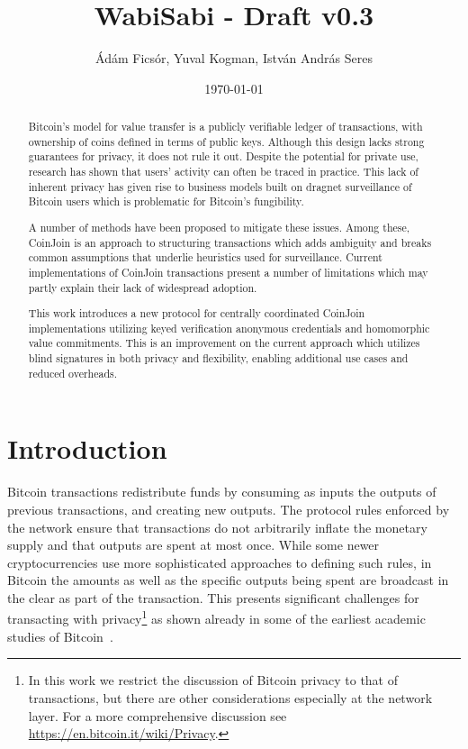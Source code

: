 \documentclass{article}
\title{WabiSabi - Draft v0.3}
\author{Ádám Ficsór, Yuval Kogman, István András Seres}
\date{\today}
\begin{document}
\maketitle

\begin{abstract}
  Bitcoin's model for value transfer is a publicly verifiable ledger of transactions, with ownership of coins defined in terms of public keys. Although this design lacks strong guarantees for privacy, it does not rule it out.
  Despite the potential for private use, research has shown that users' activity can often be traced in practice.
  This lack of inherent privacy has given rise to business models built on dragnet surveillance of Bitcoin users which is problematic for Bitcoin's fungibility.

  A number of methods have been proposed to mitigate these issues. Among these, CoinJoin is an approach to structuring transactions which adds ambiguity and breaks common assumptions that underlie heuristics used for surveillance.
  Current implementations of CoinJoin transactions present a number of limitations which may partly explain their lack of widespread adoption.

  This work introduces a new protocol for centrally coordinated CoinJoin implementations utilizing keyed verification anonymous credentials and homomorphic value commitments. This is an improvement on the current approach which utilizes blind signatures in both privacy and flexibility, enabling additional use cases and reduced overheads.
\end{abstract}

\section{Introduction}

Bitcoin transactions redistribute funds by consuming as inputs the outputs of previous transactions, and creating new outputs. The protocol rules enforced by the network ensure that transactions do not arbitrarily inflate the monetary supply and that outputs are spent at most once. While some newer cryptocurrencies use more sophisticated approaches to defining such rules, in Bitcoin the amounts as well as the specific outputs being spent are broadcast in the clear as part of the transaction. This presents significant challenges for transacting with privacy\footnote{In this work we restrict the discussion of Bitcoin privacy to that of transactions, but there are other considerations especially at the network layer. For a more comprehensive discussion see \url{https://en.bitcoin.it/wiki/Privacy}.} as shown already in some of the earliest academic studies of Bitcoin~\cite{reid2013analysis,ron2013quantitative,androulaki2013evaluating,ober2013structure,moeser2013inquiry,meiklejohn2013fistful}.
\end{document}
